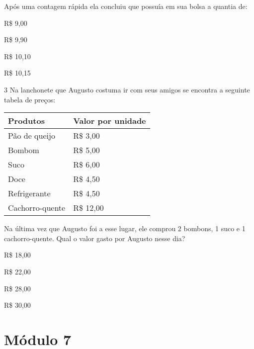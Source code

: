 Após uma contagem rápida ela concluiu que possuía em sua bolsa a quantia
de:

\begin{escolha}
\item
  R\$ 9,00
\item
  R\$ 9,90
\item
  R\$ 10,10
\item
  R\$ 10,15
\end{escolha}


\num{3} Na lanchonete que Augusto costuma ir com seus amigos se encontra a
seguinte tabela de preços:

\begin{longtable}[]{@{}ll@{}}
\toprule
Produtos & Valor por unidade\tabularnewline
\midrule
\endhead
Pão de queijo & R\$ 3,00\tabularnewline
Bombom & R\$ 5,00\tabularnewline
Suco & R\$ 6,00\tabularnewline
Doce & R\$ 4,50\tabularnewline
Refrigerante & R\$ 4,50\tabularnewline
Cachorro-quente & R\$ 12,00\tabularnewline
\bottomrule
\end{longtable}

Na última vez que Augusto foi a esse lugar, ele comprou 2 bombons, 1
suco e 1 cachorro-quente. Qual o valor gasto por Augusto nesse dia?

\begin{escolha}
\item
  R\$ 18,00
\item
  R\$ 22,00
\item
  R\$ 28,00
\item
  R\$ 30,00
\end{escolha}


\chapter{Módulo 7}



